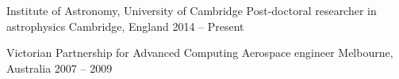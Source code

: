 
\begin{cventries}
  \cventry
    {Institute of Astronomy, University of Cambridge}
    {Post-doctoral researcher in astrophysics}
    {Cambridge, England}
    {2014 -- Present}
    {}

  \cventry
    {Victorian Partnership for Advanced Computing}
    {Aerospace engineer}
    {Melbourne, Australia}
    {2007 -- 2009}
    {}
	
\end{cventries}
